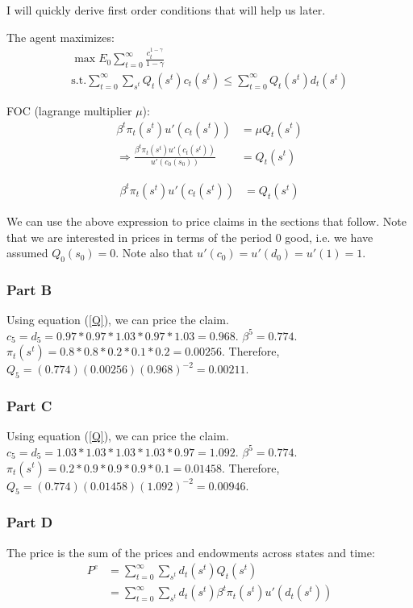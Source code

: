 \documentclass[11pt]{article} %
\begin{document}
I will quickly derive first order conditions that will help us later.

The agent maximizes:
\begin{align*}
\max E_0 \sum_{t=0}^{\infty}\frac{c_t^{1-\gamma}}{1-\gamma}\\
\text{s.t.} \sum_{t=0}^{\infty}\sum_{s^t}Q_t(s^t)c_t(s^t) \leq \sum_{t=0}^{\infty}Q_t(s^t)d_t(s^t)
\end{align*}

FOC (lagrange multiplier $\mu$):
\begin{align*}
\beta^t\pi_t(s^t)u'(c_t(s^t)) &= \mu Q_t(s^t)\\
\Rightarrow \frac{\beta^t \pi_t(s^t)u'(c_t(s^t))}{u'(c_0(s_0))} &= Q_{t}(s^t)
\end{align*}

\begin{align}
\beta^t \pi_t(s^t)u'(c_t(s^t)) &=  Q_{t}(s^t) \label{Q}
\end{align}

We can use the above expression to price claims in the sections that follow. Note that we are interested in prices in terms of the period $0$ good, i.e. we have assumed $Q_0(s_0) = 0.$ Note also that $u'(c_0) = u'(d_0) = u'(1) = 1.$
\subsubsection{Part B}
Using equation (\ref{Q}), we can price the claim. $c_5 = d_5 = 0.97*0.97*1.03*0.97*1.03 = 0.968$. $\beta^5 = 0.774$. $\pi_t(s^t) = 0.8*0.8*0.2*0.1*0.2 = 0.00256$. Therefore, $Q_5 = ( 0.774)(0.00256)(0.968)^{-2} = 0.00211$.
\subsubsection{Part C}
Using equation (\ref{Q}), we can price the claim. $c_5 = d_5 = 1.03*1.03*1.03*1.03*0.97 = 1.092$. $\beta^5 = 0.774$. $\pi_t(s^t) = 0.2*0.9*0.9*0.9*0.1 = 0.01458$. Therefore, $Q_5 =  ( 0.774)(0.01458)(1.092)^{-2} = 0.00946$.
\subsubsection{Part D}
The price is the sum of the prices and endowments across states and time:
\begin{align*}
P^e &= \sum_{t=0}^{\infty}\sum_{s^t} d_t(s^t)Q_{t}(s^t)\\
&= \sum_{t=0}^{\infty}\sum_{s^t} d_t(s^t)\beta^t \pi_t(s^t)u'(d_t(s^t))
\end{align*} 
\end{document}
